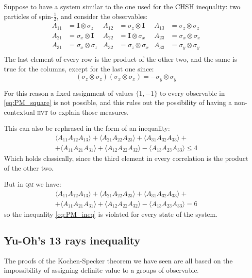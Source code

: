 \documentclass[a4paper]{article}
\newcommand{\acron}[1]{\textsc{#1}}
\newcommand{\HVT}{\acron{hvt}}
\newcommand{\QM}{\acron{qm}}
\newcommand{\I}{\mathbf{I}}
\theoremstyle{definition}
\begin{document}
Suppose to have a system similar to the one used for the \acron{CHSH}
inequality: two particles of spin-$\frac{1}{2}$, and consider the
observables:
\begin{align}
    A_{11}&=\I\otimes\sigma_z  &A_{12}&=\sigma_z\otimes\I &A_{13}&=\sigma_z\otimes\sigma_z \\
    A_{21}&=\sigma_x\otimes\I  &A_{22}&=\I\otimes\sigma_x &A_{23}&=\sigma_x\otimes\sigma_x \\
    A_{31}&=\sigma_x\otimes\sigma_z  &A_{32}&=\sigma_z\otimes\sigma_x &A_{33}&=\sigma_y\otimes\sigma_y \\
    \label{eq:PM_square}
\end{align}
The last element of every row is the product of the other two, and the same
is true for the columns, except for the last one since: 
\begin{equation}
    (\sigma_z\otimes\sigma_z) (\sigma_x\otimes\sigma_x) = - \sigma_y\otimes\sigma_y
    \label{eq:PM_lastcol}
\end{equation}

For this reason a fixed assignment of values $\{1,-1\}$ to every observable in
\eqref{eq:PM_square} is not possible, and this rules out the possibility of
having a non-contextual \HVT{} to explain those measures.

This can also be rephrased in the form of an inequality:
\begin{multline}
    \langle{A_{11}A_{12}A_{13}}\rangle + 
    \langle{A_{21}A_{22}A_{23}}\rangle + 
    \langle{A_{31}A_{32}A_{33}}\rangle +\\ +
    \langle{A_{11}A_{21}A_{31}}\rangle + 
    \langle{A_{12}A_{22}A_{32}}\rangle - 
    \langle{A_{13}A_{23}A_{33}}\rangle \le 4 
    \label{eq:PM_ineq}
\end{multline}
Which holds classically, since the third element in every correlation is the
product of the other two.

But in \QM{} we have:
\begin{multline}
    \langle{A_{11}A_{12}A_{13}}\rangle + 
    \langle{A_{21}A_{22}A_{23}}\rangle + 
    \langle{A_{31}A_{32}A_{33}}\rangle +\\ +
    \langle{A_{11}A_{21}A_{31}}\rangle + 
    \langle{A_{12}A_{22}A_{32}}\rangle - 
    \langle{A_{13}A_{23}A_{33}}\rangle = 6 
\end{multline}
so the inequality \eqref{eq:PM_ineq} is violated for every state of the system.

\subsection{Yu-Oh's 13 rays inequality}
\label{sec:YO13}
The proofs of the Kochen-Specker theorem we have seen are all based on the
impossibility of assigning definite value to a groups of observable.
\end{document}
